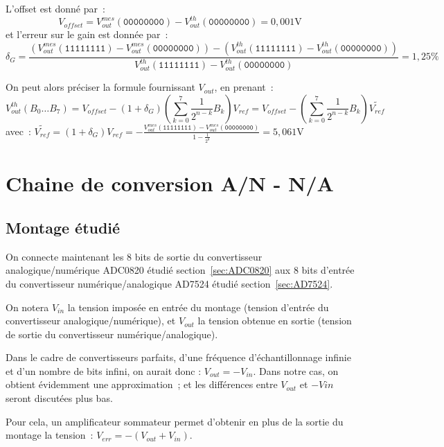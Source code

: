 \documentclass{article}
\begin{document}
L'offset est donné par~: 
\begin{equation*}
V_{offset}=V_{out}^{mes}(\mathtt{00000000})-V_{out}^{th}(\mathtt{00000000})=0,001\mathrm{V}
\end{equation*}
et l'erreur sur le gain est donnée par~:
\begin{equation*}
\delta_G=\frac{(V_{out}^{mes}(\mathtt{11111111})-V_{out}^{mes}(\mathtt{00000000}))-(V_{out}^{th}(\mathtt{11111111})-V_{out}^{th}(\mathtt{00000000}))}{V_{out}^{th}(\mathtt{11111111})-V_{out}^{th}(\mathtt{00000000})}=1,25\mathrm{\%}
\end{equation*}

On peut alors préciser la formule fournissant $V_{out}$, en prenant~:
\begin{equation*}
V_{out}^{th}(B_0\dots B_7) = V_{offset}-(1+\delta_G)\left(\sum_{k=0}^{7}\frac{1}{2^{n-k}}B_k\right)V_{ref} = V_{offset}-\left(\sum_{k=0}^{7}\frac{1}{2^{n-k}}B_k\right)\widetilde{V_{ref}}
\end{equation*}
avec~: $\widetilde{V_{ref}} = (1+\delta_G)V_{ref} = -\frac{V_{out}^{mes}(\mathtt{11111111})-V_{out}^{mes}(\mathtt{00000000})}{1-\frac{1}{2^8}} = 5,061\mathrm{V}$



\section{Chaine de conversion A/N - N/A}


\subsection{Montage étudié}

On connecte maintenant les 8 bits de sortie du convertisseur analogique/numérique ADC0820 étudié section~\ref{sec:ADC0820} aux 8 bits d'entrée du convertisseur numérique/analogique AD7524 étudié section~\ref{sec:AD7524}.

On notera $V_{in}$ la tension imposée en entrée du montage (tension d'entrée du convertisseur analogique/numérique), et $V_{out}$ la tension obtenue en sortie (tension de sortie du convertisseur numérique/analogique). 

Dans le cadre de convertisseurs parfaits, d'une fréquence d'échantillonnage infinie et d'un nombre de bits infini, on aurait donc : $V_{out}=-V_{in}$. Dans notre cas, on obtient évidemment une approximation~; et les différences entre $V_{out}$ et $-V{in}$ seront discutées plus bas.

Pour cela, un amplificateur sommateur permet d'obtenir en plus de la sortie du montage la tension~: ${V_{err}=-(V_{out}+V_{in})}$.
\end{document}
